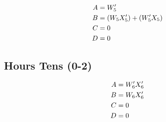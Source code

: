 \begin{align}
A &= W_5' \notag\\
B &= (W_5 X_5') + (W_5' X_5) \notag\\
C &= 0 \notag\\
D &= 0 \notag
\end{align}

\subsection{Hours Tens (0-2)}


\begin{align}
A &= W_6' X_6' \notag\\
B &= W_6 X_6' \notag\\
C &= 0 \notag\\
D &= 0 \notag
\end{align}

